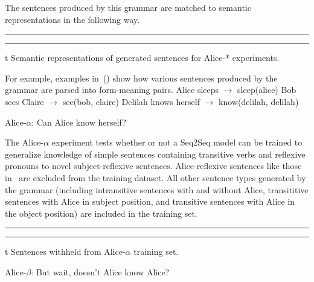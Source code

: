 The sentences produced by this grammar are matched to semantic representations
in the following way.

\par\nobreak\medskip
\hrule width 5.5in
\smallskip
{}
\smallskip
\hrule width 5.5in
\par\nobreak\medskip
\caption/t Semantic representations of generated sentences for Alice-* experiments.

For example, examples in~(\nextx) show how various sentences produced by the
grammar are parsed into form-meaning pairs.
\pex
	\a Alice sleeps $\to$ sleep(alice)
	\a Bob sees Claire $\to$ see(bob, claire)
	\a Delilah knows herself $\to$ know(delilah, delilah)
\xe

\ssec Alice-$\alpha$: Can Alice know herself?

The Alice-$\alpha$ experiment tests whether or not a Seq2Seq model can be 
trained to generalize knowledge of simple sentences containing transitive
verbs and reflexive pronouns to novel subject-reflexive sentences. 
Alice-reflexive sentences like those in~ are excluded 
from the training dataset. All other sentence types generated by the grammar
(including intransitive sentences with and without Alice, transititive 
sentences with Alice in subject position, and transitive sentences with Alice 
in the object position) are included in the training set.

\par\nobreak\medskip
\hrule width 5.5in
\smallskip
{}
\smallskip
\hrule width 5.5in
\par\nobreak\medskip
\caption/t Sentences withheld from Alice-$\alpha$ training set.

\ssec Alice-$\beta$: But wait, doesn't Alice know Alice?

